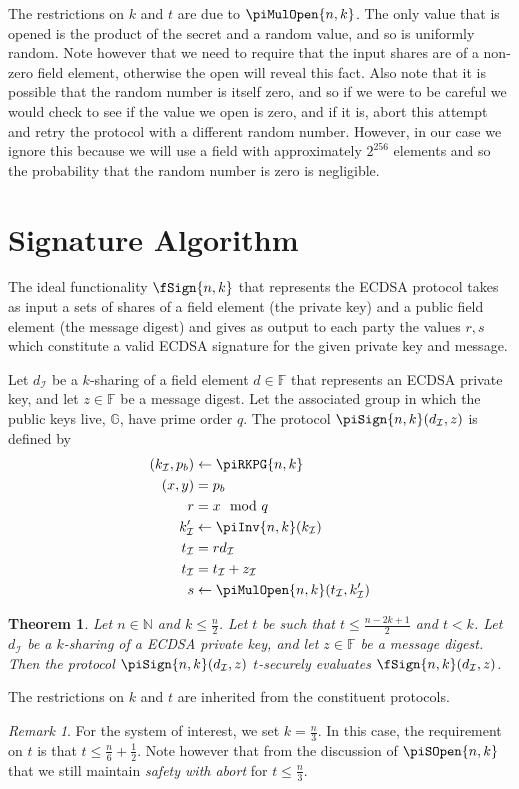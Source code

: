 \documentclass{article}
\newtheorem{theorem}{Theorem}
\theoremstyle{remark}
\newtheorem{remark}{Remark}
\newcommand{\N}{\mathbb{N}}
\newcommand{\F}{\mathbb{F}}
\newcommand{\G}{\mathbb{G}}
\begin{document}
The restrictions on $k$ and $t$ are due to $\piMulOpen{n,k}$. The only value
that is opened is the product of the secret and a random value, and so is
uniformly random. Note however that we need to require that the input shares
are of a non-zero field element, otherwise the open will reveal this fact. Also
note that it is possible that the random number is itself zero, and so if we
were to be careful we would check to see if the value we open is zero, and if
it is, abort this attempt and retry the protocol with a different random
number. However, in our case we ignore this because we will use a field with
approximately $2^{256}$ elements and so the probability that the random number
is zero is negligible.

\section{Signature Algorithm}

The ideal functionality $\fSign{n,k}$ that represents the ECDSA protocol takes
as input a sets of shares of a field element (the private key) and a public
field element (the message digest) and gives as output to each party the values
$r, s$ which constitute a valid ECDSA signature for the given private key and
message.

Let $d_\mathcal{I}$ be a $k$-sharing of a field element $d \in \F$ that
represents an ECDSA private key, and let $z \in \F$ be a message digest. Let
the associated group in which the public keys live, $\G$, have prime order $q$.
The protocol $\piSign{n,k}(d_\mathcal{I}, z)$ is defined by
\begin{align*}
	(k_\mathcal{I}, p_b) &\leftarrow \piRKPG{n,k}\\
	(x, y) &= p_b\\
	r &= x \mod q\\
	k'_\mathcal{I} &\leftarrow \piInv{n,k}(k_\mathcal{I})\\
	t_\mathcal{I} &= rd_\mathcal{I}\\
	t_\mathcal{I} &= t_\mathcal{I} + z_\mathcal{I}\\
	s &\leftarrow \piMulOpen{n,k}(t_\mathcal{I}, k'_\mathcal{I})
\end{align*}

\begin{theorem}
	Let $n \in \N$ and $k \le \frac{n}{2}$. Let $t$ be such that $t \le \frac{n
	- 2k + 1}{2}$ and $t < k$. Let $d_\mathcal{I}$ be a $k$-sharing of a ECDSA
	private key, and let $z \in \F$ be a message digest. Then the protocol
	$\piSign{n,k}(d_\mathcal{I}, z)$ $t$-securely evaluates
	$\fSign{n,k}(d_\mathcal{I}, z)$.
\end{theorem}
The restrictions on $k$ and $t$ are inherited from the constituent protocols.

\begin{remark}
	For the system of interest, we set $k = \frac{n}{3}$. In this case, the
	requirement on $t$ is that $t \le \frac{n}{6} + \frac{1}{2}$. Note however
	that from the discussion of $\piSOpen{n,k}$ that we still maintain
	\textit{safety with abort} for $t \le \frac{n}{3}$.
\end{remark}

\newpage
\printbibliography{}
\end{document}
